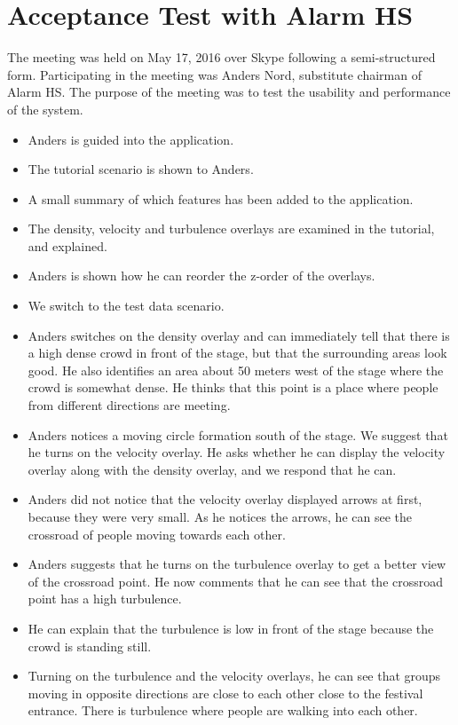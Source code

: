 \section{Acceptance Test with Alarm HS}\label{appendix:final_meeting_anders_nord}

The meeting was held on May 17, 2016 over Skype following a semi-structured form. Participating in the meeting was Anders Nord, substitute chairman of Alarm HS. The purpose of the meeting was to test the usability and performance of the system.

\begin{itemize}
    \item Anders is guided into the application.
    \item The tutorial scenario is shown to Anders.
    \item A small summary of which features has been added to the application.
    \item The density, velocity and turbulence overlays are examined in the tutorial, and explained.
    \item Anders is shown how he can reorder the z-order of the overlays.
    \item We switch to the test data scenario.
    \item Anders switches on the density overlay and can immediately tell that there is a high dense crowd in front of the stage, but that the surrounding areas look good. He also identifies an area about 50 meters west of the stage where the crowd is somewhat dense. He thinks that this point is a place where people from different directions are meeting.
    \item Anders notices a moving circle formation south of the stage. We suggest that he turns on the velocity overlay. He asks whether he can display the velocity overlay along with the density overlay, and we respond that he can.
    \item Anders did not notice that the velocity overlay displayed arrows at first, because they were very small. As he notices the arrows, he can see the crossroad of people moving towards each other.
    \item Anders suggests that he turns on the turbulence overlay to get a better view of the crossroad point. He now comments that he can see that the crossroad point has a high turbulence.
    \item He can explain that the turbulence is low in front of the stage because the crowd is standing still.
    \item Turning on the turbulence and the velocity overlays, he can see that groups moving in opposite directions are close to each other close to the festival entrance. There is turbulence where people are walking into each other.

\end{itemize}

